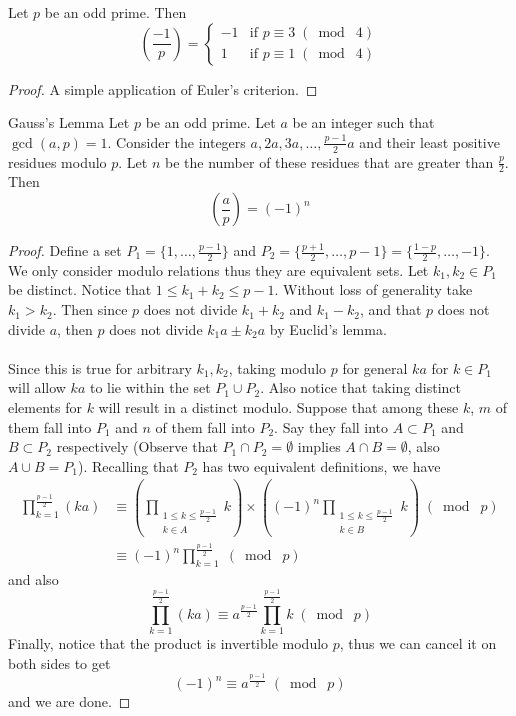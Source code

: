 \documentclass[a4paper]{article}
\begin{document}
\begin{crl}{}{} Let $p$ be an odd prime. Then $$\left(\frac{-1}{p}\right)=\begin{cases}
-1 & \text{if }p\equiv 3\;(\bmod\; 4)\\
1 & \text{if }p\equiv 1\;(\bmod\; 4)
\end{cases}$$ \tcbline
\begin{proof}
A simple application of Euler's criterion. 
\end{proof}
\end{crl}

\begin{prp}{Gauss's Lemma}{} Let $p$ be an odd prime. Let $a$ be an integer such that $\gcd(a,p)=1$. Consider the integers $a,2a,3a,\dots,\frac{p-1}{2}a$ and their least positive residues modulo $p$. Let $n$ be the number of these residues that are greater than $\frac{p}{2}$. Then $$\left(\frac{a}{p}\right)=(-1)^n$$ \tcbline
\begin{proof}
Define a set $P_1=\{1,\dots,\frac{p-1}{2}\}$ and $P_2=\{\frac{p+1}{2},\dots,p-1\}=\{\frac{1-p}{2},\dots,-1\}$. We  only consider modulo relations thus they are equivalent sets. Let $k_1,k_2\in P_1$ be distinct. Notice that $1\leq k_1+k_2\leq p-1$. Without loss of generality take $k_1>k_2$. Then since $p$ does not divide $k_1+k_2$ and $k_1-k_2$, and that $p$ does not divide $a$, then $p$ does not divide $k_1a\pm k_2a$ by Euclid's lemma. \\~\\
Since this is true for arbitrary $k_1,k_2$, taking modulo $p$ for general $ka$ for $k\in P_1$ will allow $ka$ to lie within the set $P_1\cup P_2$. Also notice that taking distinct elements for $k$ will result in a distinct modulo. Suppose that among these $k$, $m$ of them fall into $P_1$ and $n$ of them fall into $P_2$. Say they fall into $A\subset P_1$ and $B\subset P_2$ respectively (Observe that $P_1\cap P_2=\emptyset$ implies $A\cap B=\emptyset$, also $A\cup B=P_1$). Recalling that $P_2$ has two equivalent definitions, we have 
\begin{align*}
\prod_{k=1}^{\frac{p-1}{2}}(ka)&\equiv\left(\prod_{\substack{1\leq k\leq \frac{p-1}{2}\\k\in A}}k\right)\times\left((-1)^n\prod_{\substack{1\leq k\leq \frac{p-1}{2}\\k\in B}}k\right)\;(\bmod\;p)\\
&\equiv(-1)^n\prod_{k=1}^{\frac{p-1}{2}}\;(\bmod\;p)
\end{align*}
and also $$\prod_{k=1}^{\frac{p-1}{2}}(ka)\equiv a^{\frac{p-1}{2}}\prod_{k=1}^{\frac{p-1}{2}}k\;(\bmod\;p)$$
Finally, notice that the product is invertible modulo $p$, thus we can cancel it on both sides to get $$(-1)^n\equiv a^{\frac{p-1}{2}}\;(\bmod\;p)$$ and we are done. 
\end{proof}
\end{prp}
\end{document}
